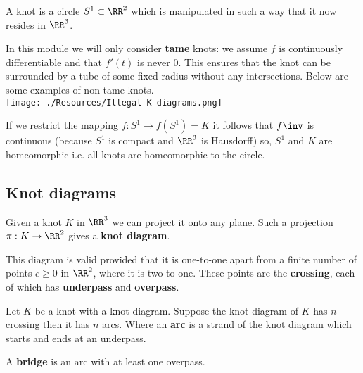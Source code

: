 \documentclass[12pt, a4paper]{article}
\begin{document}
\begin{mdnote}
    A knot is a circle \(S^1 \subset \RR^2\) which is manipulated in such a way that it now resides in \(\RR^3\).
\end{mdnote}

\begin{mdremark}
    In this module we will only consider \textbf{tame} knots: we assume \(f\) is continuously differentiable and that \(f'(t)\) is never 0. This ensures that the knot can be surrounded by a tube of some fixed radius without any intersections. Below are some examples of non-tame knots. \\
    \texttt{[image: ./Resources/Illegal K diagrams.png]}
\end{mdremark}

\begin{mdremark}
    If we restrict the mapping \(f : S^1 \to f(S^1)=K\) it follows that \(f\inv\) is continuous (because \(S^1\) is compact and \(\RR^3\) is Hausdorff) so, \(S^1\) and \(K\) are homeomorphic i.e. all knots are homeomorphic to the circle.
\end{mdremark}

\subsection{Knot diagrams}

\begin{definition}
    Given a knot \(K\) in \(\RR^3\) we can project it onto any plane. Such a projection \(\pi : K \to \RR^2\) gives a \textbf{knot diagram}. 
\end{definition}

\begin{mdremark}
    This diagram is valid provided that it is one-to-one apart from a finite number of points \(c \geq 0\) in \(\RR^2\), where it is two-to-one. These points are the \textbf{crossing}, each of which has \textbf{underpass} and \textbf{overpass}.
\end{mdremark}

\begin{mdprop}
    Let \(K\) be a knot with a knot diagram. Suppose the knot diagram of \(K\) has \(n\) crossing then it has \(n\) arcs. Where an \textbf{arc} is a strand of the knot diagram which starts and ends at an underpass.
\end{mdprop}

\begin{definition}
    A \textbf{bridge} is an arc with at least one overpass.
\end{definition}
\end{document}

